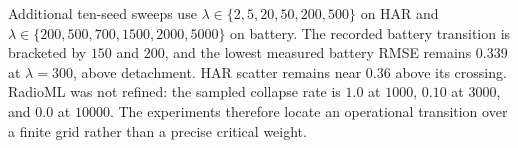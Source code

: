 \documentclass{article}
\begin{document}
Additional ten-seed sweeps use $\lambda\in\{2,5,20,50,200,500\}$ on HAR and $\lambda\in\{200,500,700,1500,2000,5000\}$ on battery. The recorded battery transition is bracketed by $150$ and $200$, and the lowest measured battery RMSE remains $0.339$ at $\lambda=300$, above detachment. HAR scatter remains near $0.36$ above its crossing. RadioML was not refined: the sampled collapse rate is $1.0$ at $1000$, $0.10$ at $3000$, and $0.0$ at $10000$. The experiments therefore locate an operational transition over a finite grid rather than a precise critical weight.





















\end{document}
